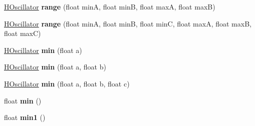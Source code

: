 \begin{DoxyCompactItemize}
\item 
\hypertarget{classhype_1_1extended_1_1behavior_1_1_h_oscillator_a82a6adf7aaaa8f153c0150ade0d05674}{\hyperlink{classhype_1_1extended_1_1behavior_1_1_h_oscillator}{H\-Oscillator} {\bfseries range} (float min\-A, float min\-B, float max\-A, float max\-B)}\label{classhype_1_1extended_1_1behavior_1_1_h_oscillator_a82a6adf7aaaa8f153c0150ade0d05674}

\item 
\hypertarget{classhype_1_1extended_1_1behavior_1_1_h_oscillator_afb72e1eee00543b6747ece3e10303d75}{\hyperlink{classhype_1_1extended_1_1behavior_1_1_h_oscillator}{H\-Oscillator} {\bfseries range} (float min\-A, float min\-B, float min\-C, float max\-A, float max\-B, float max\-C)}\label{classhype_1_1extended_1_1behavior_1_1_h_oscillator_afb72e1eee00543b6747ece3e10303d75}

\item 
\hypertarget{classhype_1_1extended_1_1behavior_1_1_h_oscillator_a4b7f4e79c8f6f9cedc238389d40b85cb}{\hyperlink{classhype_1_1extended_1_1behavior_1_1_h_oscillator}{H\-Oscillator} {\bfseries min} (float a)}\label{classhype_1_1extended_1_1behavior_1_1_h_oscillator_a4b7f4e79c8f6f9cedc238389d40b85cb}

\item 
\hypertarget{classhype_1_1extended_1_1behavior_1_1_h_oscillator_a5d6aec06e312a4041097584a0f19dd4e}{\hyperlink{classhype_1_1extended_1_1behavior_1_1_h_oscillator}{H\-Oscillator} {\bfseries min} (float a, float b)}\label{classhype_1_1extended_1_1behavior_1_1_h_oscillator_a5d6aec06e312a4041097584a0f19dd4e}

\item 
\hypertarget{classhype_1_1extended_1_1behavior_1_1_h_oscillator_a9923361376e0e201ff5427a9e79f1585}{\hyperlink{classhype_1_1extended_1_1behavior_1_1_h_oscillator}{H\-Oscillator} {\bfseries min} (float a, float b, float c)}\label{classhype_1_1extended_1_1behavior_1_1_h_oscillator_a9923361376e0e201ff5427a9e79f1585}

\item 
\hypertarget{classhype_1_1extended_1_1behavior_1_1_h_oscillator_aa7ca3fe006360554a8f890d670910d86}{float {\bfseries min} ()}\label{classhype_1_1extended_1_1behavior_1_1_h_oscillator_aa7ca3fe006360554a8f890d670910d86}

\item 
\hypertarget{classhype_1_1extended_1_1behavior_1_1_h_oscillator_a2a5c8cf005c54d0369b7ff8cbff0369d}{float {\bfseries min1} ()}\label{classhype_1_1extended_1_1behavior_1_1_h_oscillator_a2a5c8cf005c54d0369b7ff8cbff0369d}


\end{DoxyCompactItemize}
